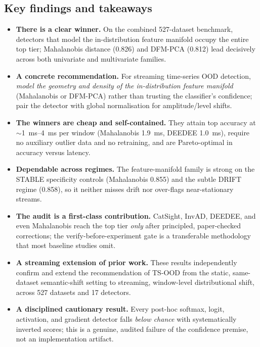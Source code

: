 \subsection{Key findings and takeaways}\label{sec:disc-takeaways}
\begin{itemize}
  \item \textbf{There is a clear winner.} On the combined \num{527}-dataset
  benchmark, detectors that model the in-distribution feature manifold occupy the
  entire top tier; Mahalanobis distance (\num{0.826}) and DFM-PCA (\num{0.812})
  lead decisively across both univariate and multivariate families.
  \item \textbf{A concrete recommendation.} For streaming time-series OOD
  detection, \emph{model the geometry and density of the in-distribution feature
  manifold} (Mahalanobis or DFM-PCA) rather than trusting the classifier's
  confidence; pair the detector with global normalisation for amplitude/level
  shifts.
  \item \textbf{The winners are cheap and self-contained.} They attain top accuracy
  at $\sim$\SIrange{1}{4}{\milli\second} per window (Mahalanobis
  \SI{1.9}{\milli\second}, DEEDEE \SI{1.0}{\milli\second}), require no auxiliary
  outlier data and no retraining, and are Pareto-optimal in accuracy versus latency.
  \item \textbf{Dependable across regimes.} The feature-manifold family is strong on
  the STABLE specificity controls (Mahalanobis \num{0.855}) and the subtle DRIFT
  regime (\num{0.858}), so it neither misses drift nor over-flags near-stationary
  streams.
  \item \textbf{The audit is a first-class contribution.} CatSight, InvAD, DEEDEE,
  and even Mahalanobis reach the top tier \emph{only} after principled,
  paper-checked corrections; the verify-before-experiment gate is a transferable
  methodology that most baseline studies omit.
  \item \textbf{A streaming extension of prior work.} These results independently
  confirm and extend the recommendation of TS-OOD \citep{Gungor2025} from the
  static, same-dataset semantic-shift setting to streaming, window-level
  distributional shift, across \num{527} datasets and \num{17} detectors.
  \item \textbf{A disciplined cautionary result.} Every post-hoc softmax, logit,
  activation, and gradient detector falls \emph{below chance} with systematically
  inverted scores; this is a genuine, audited failure of the confidence premise,
  not an implementation artifact.
\end{itemize}


